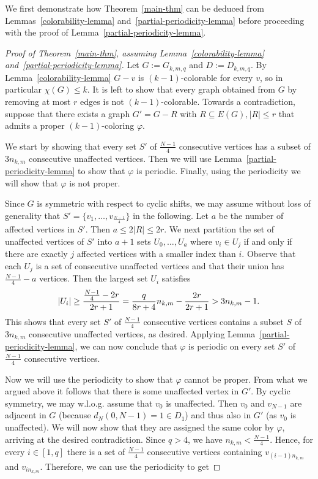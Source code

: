 \documentclass[a4paper,10pt,hidelinks]{amsart}
\renewcommand{\phi}{\ensuremath{\varphi}}
\theoremstyle{definition}
\begin{document}
    We first demonstrate how Theorem~\ref{main-thm} can be deduced from Lemmas~\ref{colorability-lemma} and~\ref{partial-periodicity-lemma} before proceeding with the proof of Lemma~\ref{partial-periodicity-lemma}.

    \begin{proof}[Proof of Theorem~\ref{main-thm}, assuming Lemma~\ref{colorability-lemma} and~\ref{partial-periodicity-lemma}]
        Let $G := G_{k, m, q}$ and $D := D_{k, m, q}$. By Lemma~\ref{colorability-lemma} $G-v$ is $(k-1)$-colorable for every $v$, so in particular $\chi(G) \leq k$. It is left to show that every graph obtained from $G$ by removing at most $r$ edges is not $(k-1)$-colorable. Towards a contradiction, suppose that there exists a graph $G'=G-R$ with $R\subseteq E(G), |R|\le r$ that admits a proper $(k-1)$-coloring $\phi$.

        We start by showing that every set $S'$ of $\frac{N-1}{4}$ consecutive vertices has a subset of $3n_{k,m}$ consecutive unaffected vertices. Then we will use Lemma~\ref{partial-periodicity-lemma} to show that $\varphi$ is periodic. Finally, using the periodicity we will show that $\varphi$ is not proper.

        Since $G$ is symmetric with respect to cyclic shifts, we may assume without loss of generality that $S' = \{v_1, \dots, v_{\frac{N - 1}{4}}\}$ in the following. Let $a$ be the number of affected vertices in $S'$. Then $a \leq 2|R|\le 2r$. We next partition the set of unaffected vertices of $S'$ into $a + 1$ sets $U_0, \dots, U_{a}$ where $v_i \in U_j$ if and only if there are exactly $j$ affected vertices with a smaller index than $i$. Observe that each $U_j$ is a set of consecutive unaffected vertices and that their union has $\frac{N-1}{4} - a$ vertices. Then the largest set $U_i$ satisfies
        \begin{equation}\notag
            |U_i| \geq \frac{\frac{N - 1}{4} - 2r}{2r + 1} = \frac{q}{8r + 4}n_{k, m} - \frac{2r}{2r + 1} > 3n_{k, m} - 1.
        \end{equation}
        This shows that every set $S'$ of $\frac{N-1}{4}$ consecutive vertices contains a subset $S$ of $3n_{k,m}$ consecutive unaffected vertices, as desired. Applying Lemma~\ref{partial-periodicity-lemma}, we can now conclude that $\varphi$ is periodic on every set $S'$ of $\frac{N-1}{4}$ consecutive vertices.

        Now we will use the periodicity to show that $\varphi$ cannot be proper.
        From what we argued above it follows that there is some unaffected vertex in $G'$. By cyclic symmetry, we may w.l.o.g. assume that $v_0$ is unaffected. Then $v_0$ and $v_{N-1}$ are adjacent in $G$ (because $d_N(0, N-1) = 1 \in D_1$) and thus also in $G'$ (as $v_0$ is unaffected). We will now show that they are assigned the same color by $\varphi$, arriving at the desired contradiction. Since $q > 4$, we have $n_{k, m} < \frac{N - 1}{4}$. Hence, for every $i \in [1, q]$ there is a set of $\frac{N-1}{4}$ consecutive vertices containing $v_{(i-1)n_{k,m}}$ and $v_{in_{k,m}}$. Therefore, we can use the periodicity to get


\end{proof}
\end{document}
